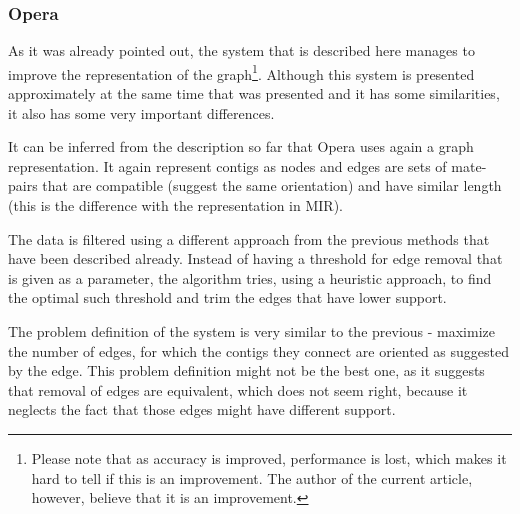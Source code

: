 \documentclass[11pt]{article}
\begin{document}



\subsubsection{Opera} %
\label{ssub:Opera}
As it was already pointed out, the system that is described here manages to
improve the representation of the graph\footnote{Please note that as accuracy is
improved, performance is lost, which makes it hard to tell if this is an
improvement. The author of the current article, however, believe that it is an
improvement.}. Although this system \cite{Opera} is presented approximately at
the same time that \cite{MIR} was presented and it has some similarities, it
also has some very important differences. 

It can be inferred from the description so far that Opera uses again a graph
representation. It again represent contigs as nodes and edges are sets of
mate-pairs that are compatible (suggest the same orientation) and have similar
length (this is the difference with the representation in MIR).

The data is filtered using a different approach from the previous methods that
have been described already. Instead of having a threshold for edge removal
that is given as a parameter, the algorithm tries, using a heuristic approach,
to find the optimal such threshold and trim the edges that have lower support.

The problem definition of the system is very similar to the previous - maximize
the number of edges, for which the contigs they connect are oriented as
suggested by the edge. This problem definition might not be the best one, as it
suggests that removal of edges are equivalent, which does not seem right,
because it neglects the fact that those edges might have different support.
\end{document}
